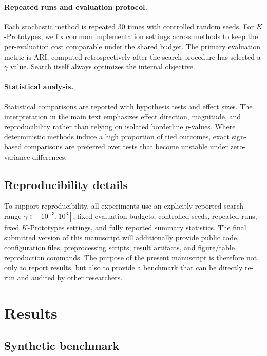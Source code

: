 \documentclass[10pt,lineno]{wlpeerj}
\begin{document}
\paragraph{Repeated runs and evaluation protocol.}
Each stochastic method is repeated 30 times with controlled random seeds. For $K$-Prototypes, we fix common implementation settings across methods to keep the per-evaluation cost comparable under the shared budget. The primary evaluation metric is ARI, computed retrospectively after the search procedure has selected a $\gamma$ value. Search itself always optimizes the internal objective.

\paragraph{Statistical analysis.}
Statistical comparisons are reported with hypothesis tests and effect sizes. The interpretation in the main text emphasizes effect direction, magnitude, and reproducibility rather than relying on isolated borderline $p$-values. Where deterministic methods induce a high proportion of tied outcomes, exact sign-based comparisons are preferred over tests that become unstable under zero-variance differences.

\subsection*{Reproducibility details}

To support reproducibility, all experiments use an explicitly reported search range $\gamma \in [10^{-3},10^3]$, fixed evaluation budgets, controlled seeds, repeated runs, fixed $K$-Prototypes settings, and fully reported summary statistics. The final submitted version of this manuscript will additionally provide public code, configuration files, preprocessing scripts, result artifacts, and figure/table reproduction commands. The purpose of the present manuscript is therefore not only to report results, but also to provide a benchmark that can be directly re-run and audited by other researchers.

\section*{Results}

\subsection*{Synthetic benchmark}
\end{document}
